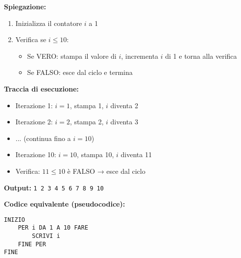 \documentclass[a4paper,16pt]{article}
\begin{document}
\begin{center}
\end{center}

\textbf{Spiegazione:}
\begin{enumerate}
    \item Inizializza il contatore $i$ a 1
    \item Verifica se $i \leq 10$:
    \begin{itemize}
        \item Se VERO: stampa il valore di $i$, incrementa $i$ di 1 e torna alla verifica
        \item Se FALSO: esce dal ciclo e termina
    \end{itemize}
\end{enumerate}

\textbf{Traccia di esecuzione:}
\begin{itemize}
    \item Iterazione 1: $i=1$, stampa 1, $i$ diventa 2
    \item Iterazione 2: $i=2$, stampa 2, $i$ diventa 3
    \item ... (continua fino a $i=10$)
    \item Iterazione 10: $i=10$, stampa 10, $i$ diventa 11
    \item Verifica: $11 \leq 10$ è FALSO → esce dal ciclo
\end{itemize}

\textbf{Output:} \texttt{1 2 3 4 5 6 7 8 9 10}

\textbf{Codice equivalente (pseudocodice):}
\begin{lstlisting}
INIZIO
    PER i DA 1 A 10 FARE
        SCRIVI i
    FINE PER
FINE
\end{lstlisting}
\end{document}
